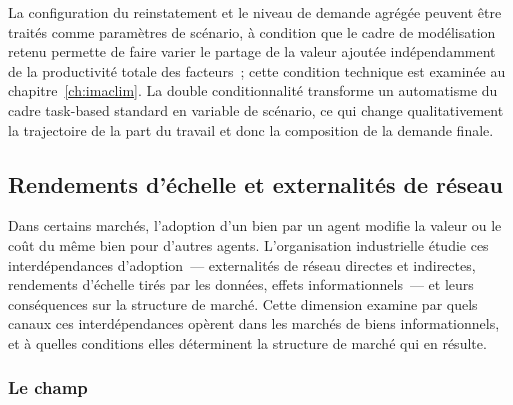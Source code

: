 La configuration du reinstatement et le niveau de demande agrégée peuvent être traités comme paramètres de scénario, à condition que le cadre de modélisation retenu permette de faire varier le partage de la valeur ajoutée indépendamment de la productivité totale des facteurs~; cette condition technique est examinée au chapitre~\ref{ch:imaclim}. La double conditionnalité transforme un automatisme du cadre task-based standard en variable de scénario, ce qui change qualitativement la trajectoire de la part du travail et donc la composition de la demande finale.



\clearpage
\subsection{Rendements d'échelle et externalités de réseau}\label{sec:d4-reseau}

Dans certains marchés, l'adoption d'un bien par un agent modifie la valeur ou le coût du même bien pour d'autres agents. L'organisation industrielle étudie ces interdépendances d'adoption~--- externalités de réseau directes et indirectes, rendements d'échelle tirés par les données, effets informationnels~--- et leurs conséquences sur la structure de marché. Cette dimension examine par quels canaux ces interdépendances opèrent dans les marchés de biens informationnels, et à quelles conditions elles déterminent la structure de marché qui en résulte.


\subsubsection{Le champ}

